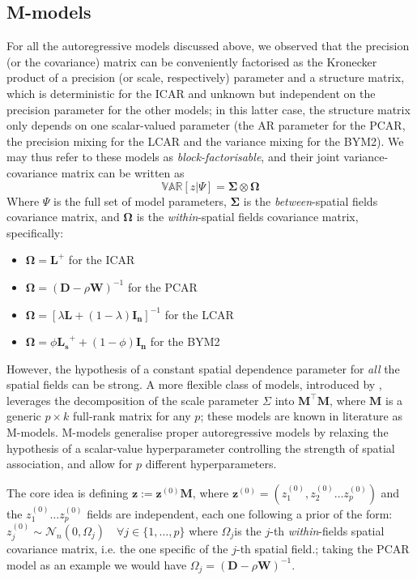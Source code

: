 \documentclass[openany, 11pt, oneside]{book}
\begin{document}
\subsection{M-models} \label{subsection:Mmodels}

For all the autoregressive models discussed above, we observed that the precision (or the covariance) matrix can be conveniently factorised as the Kronecker product of a precision (or scale, respectively) parameter and a structure matrix, which is deterministic for the ICAR and unknown but independent on the precision parameter for the other models; in this latter case, the structure matrix only depends on one scalar-valued parameter (the AR parameter for the PCAR, the precision mixing for the LCAR and the variance mixing for the BYM2). We may thus refer to these models as \textit{block-factorisable}, and their joint variance-covariance matrix can be written as
$$
\mathbb{VAR}\left[ z \vert \Psi\right] = \boldsymbol{\Sigma} \otimes \boldsymbol{\Omega}
$$
Where $\Psi$ is the full set of model parameters, $\boldsymbol{\Sigma}$ is the \textit{between}-spatial fields covariance matrix, and $\boldsymbol{\Omega}$ is the \textit{within}-spatial fields covariance matrix, specifically:
\begin{itemize}
    \item $\boldsymbol{\Omega} = \boldsymbol{L}^+$ for the ICAR
    \item $\boldsymbol{\Omega}=\left(\boldsymbol{D}-\rho \boldsymbol{W}\right)^{-1}$ for the PCAR
    \item $\boldsymbol{\Omega} = \left[\lambda \boldsymbol{L} + (1-\lambda)\boldsymbol{I_{n}} \right]^{-1}$ for the LCAR
    \item $\boldsymbol{\Omega} = \phi\boldsymbol{L_s}^+ + (1-\phi)\boldsymbol{I_{n}}$ for the BYM2
\end{itemize}

However, the hypothesis of a constant spatial dependence parameter for \textit{all} the spatial fields can be strong. A more flexible class of models, introduced by \cite{Mmodels}, leverages the decomposition of the scale parameter $\Sigma$ into $\boldsymbol{M}^ \top \boldsymbol{M}$, where $\boldsymbol{M}$ is a generic $p \times k$ full-rank matrix for any $p$; these models are known in literature as M-models. M-models generalise proper autoregressive models by relaxing the hypothesis of a scalar-value hyperparameter controlling the strength of spatial association, and allow for $p$ different hyperparameters.

The core idea is defining $\boldsymbol{z} := \boldsymbol{z}^{(0)} \boldsymbol{M}$, where $\boldsymbol{z}^{(0)} = (z_1^{(0)}, z_2^{(0)} \dots z_p^{(0)})$ and the $z_1^{(0)} \dots z_p^{(0)}$ fields are independent, each one following a prior of the form: $z_j^{(0)} \sim \mathcal{N}_{n}(0, \Omega_j) \quad \forall j \in \{1, \dots, p\}$ where $\Omega_j$is the $j$-th \textit{within}-fields spatial covariance matrix, i.e. the one specific of the $j$-th spatial field.; taking the PCAR model as an example we would have $\Omega_j = (\boldsymbol{D} - \rho \boldsymbol{W})^{-1}$.
\end{document}
